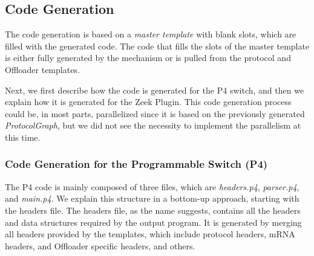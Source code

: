 \subsection{Code Generation}

The code generation is based on a \textit{master template} with blank slots, which are filled with the generated code. The code that fills the slots of the master template is either fully generated by the mechanism or is pulled from the protocol and Offloader templates.

Next, we first describe how the code is generated for the P4 switch, and then we explain how it is generated for the Zeek Plugin. This code generation process could be, in most parts, parallelized since it is based on the previously generated \textit{ProtocolGraph}, but we did not see the necessity to implement the parallelism at this time.

\subsubsection*{Code Generation for the Programmable Switch (P4)}

The P4 code is mainly composed of three files, which are \textit{headers.p4}, \textit{parser.p4}, and \textit{main.p4}. We explain this structure in a bottom-up approach, starting with the headers file. The headers file, as the name suggests, contains all the headers and data structures required by the output program. It is generated by merging all headers provided by the templates, which include protocol headers, mRNA headers, and Offloader specific headers\footnotemark{}, and others. 




